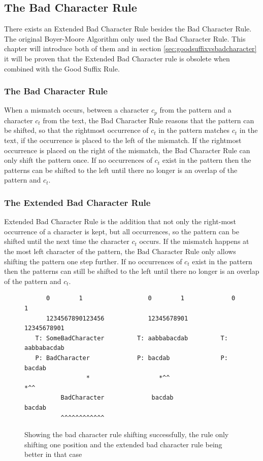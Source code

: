 \subsection{The Bad Character Rule}
There exists an Extended Bad Character Rule besides the Bad Character Rule. The original Boyer-Moore Algorithm only used the Bad Character Rule. This chapter will introduce both of them and in section \ref{sec:goodsuffixvsbadcharacter} it will be proven that the Extended Bad Character rule is obsolete when combined with the Good Suffix Rule. 

\subsubsection{The Bad Character Rule}
When a mismatch occurs, between a character $c_p$ from the pattern and a character $c_t$ from the text, the Bad Character Rule reasons that the pattern can be shifted, so that the rightmost occurrence of $c_t$ in the pattern matches $c_t$ in the text, if the occurrence is placed to the left of the mismatch. If the rightmost occurrence is placed on the right of the mismatch, the Bad Character Rule can only shift the pattern once. If no occurrences of $c_t$ exist in the pattern then the patterns can be shifted to the left until there no longer is an overlap of the pattern and $c_t$. 

\subsubsection{The Extended Bad Character Rule}
Extended Bad Character Rule is the addition that not only the right-most occurrence of a character is kept, but all occurrences, so the pattern can be shifted until the next time the character $c_t$ occurs. If the mismatch happens at the most left character of the pattern, the Bad Character Rule only allows shifting the pattern one step further.  If no occurrences of $c_t$ exist in the pattern then the patterns can still be shifted to the left until there no longer is an overlap of the pattern and $c_t$. 

\begin{figure}[t]
\begin{verbatim}
      0        1                  0        1             0        1      
      1234567890123456            12345678901            12345678901
   T: SomeBadCharacter         T: aabbabacdab         T: aabbabacdab
   P: BadCharacter             P: bacdab              P: bacdab          
                 *                   *^^                    *^^     
          BadCharacter             bacdab                   bacdab  
          ^^^^^^^^^^^^                                              
\end{verbatim}
\caption{Showing the bad character rule shifting successfully, the rule only shifting one position and the extended bad character rule being better in that case}
\label{fig:badcharacterrule_example}
\end{figure}

